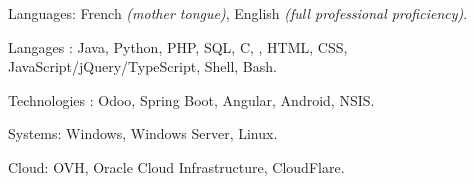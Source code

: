 \begin{indentsection}{\parindent}
  \begin{description*}
    \item[Languages:]
    French \emph{(mother tongue)}, English \emph{(full professional proficiency)}.
  \item[Langages :] Java, Python, PHP, SQL, C, \Csharp, HTML,
    CSS, JavaScript/jQuery/TypeScript, Shell, Bash.
    \item[Technologies :] Odoo, Spring Boot, Angular, Android, NSIS.
    \item[Systems:] Windows, Windows Server, Linux.
    \item[Cloud:] OVH, Oracle Cloud Infrastructure, CloudFlare.
  \end{description*}
\end{indentsection}
